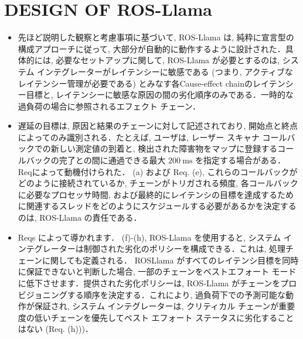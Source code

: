 
\section{DESIGN OF ROS-Llama}
\label{sec: design of ros-llama}

\begin{frame}{}
    \begin{itemize}
        \item 先ほど説明した観察と考慮事項に基づいて, ROS-Llama は, 純粋に宣言型の構成アプローチに従って, 大部分が自動的に動作するように設計された．具体的には, 必要なセットアップに関して, ROS-Llama が必要とするのは, システム インテグレーターがレイテンシーに敏感である (つまり, アクティブなレイテンシー管理が必要である) とみなす各Cause-effect chainのレイテンシー目標と, レイテンシーに敏感な原因の間の劣化順序のみである．一時的な過負荷の場合に参照されるエフェクト チェーン．
    \end{itemize}
\end{frame}

\begin{frame}{}
    \begin{itemize}
        \item 遅延の目標は, 原因と結果のチェーンに対して記述されており, 開始点と終点によってのみ識別される．たとえば, ユーザは, レーザー スキャナ コールバックでの新しい測定値の到着と, 検出された障害物をマップに登録するコールバックの完了との間に通過できる最大 $200 \mathrm{~ms}$ を指定する場合がある． Reqによって動機付けられた． (a) および Req. (e), これらのコールバックがどのように接続されているか, チェーンがトリガされる頻度, 各コールバックに必要なプロセッサ時間, および最終的にレイテンシの目標を達成するために関連するスレッドをどのようにスケジュールする必要があるかを決定するのは, ROS-Llama の責任である．
    \end{itemize}
\end{frame}

\begin{frame}{}
    \begin{itemize}
        \item Reqs によって導かれます． (f)-(h), ROS-Llama を使用すると, システム インテグレーターは制御された劣化のポリシーを構成できる．これは, 処理チェーンに関しても定義される． ROSLlama がすべてのレイテンシ目標を同時に保証できないと判断した場合, 一部のチェーンをベストエフォート モードに低下させます．提供された劣化ポリシーは, ROS-Llama がチェーンをプロビジョニングする順序を決定する．これにより, 過負荷下での予測可能な動作が保証され, システム インテグレーターは, クリティカル チェーンが重要度の低いチェーンを優先してベスト エフォート ステータスに劣化することはない (Req. (h)))．
    \end{itemize}
\end{frame}

